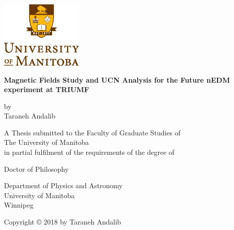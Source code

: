 \documentclass[12pt,a4paper]{book}
\begin{document}

\noindent
\begin{titlepage}
  \begin{center}
         \includegraphics[width=0.3\textwidth]{university.eps}\\
        \vspace*{1cm}
        
        \textbf{Magnetic Fields Study and UCN Analysis for the Future
          nEDM experiment at TRIUMF}
        
        \vspace{0.5cm}
        
        \vspace{1.5cm}
        
        by\\
        \vspace{1.0cm}
        Taraneh Andalib

        \vspace{2.5cm}
        A Thesis submitted to the Faculty of Graduate Studies of\\
        \vspace{0.5cm}
        The University of Manitoba\\
        \vspace{0.5cm}
        in partial fulfilment of the requirements of the degree of
        
        \vspace{2.0cm}
        
       
        Doctor of Philosophy\\
       \vspace{0.5cm}
        
   
        \vspace{0.5cm}
        Department of Physics and Astronomy\\
        University of Manitoba\\
        Winnipeg

        \vspace{3.0cm}
        Copyright © 2018 by Taraneh Andalib
        
    \end{center}
\end{titlepage}
\end{document}
